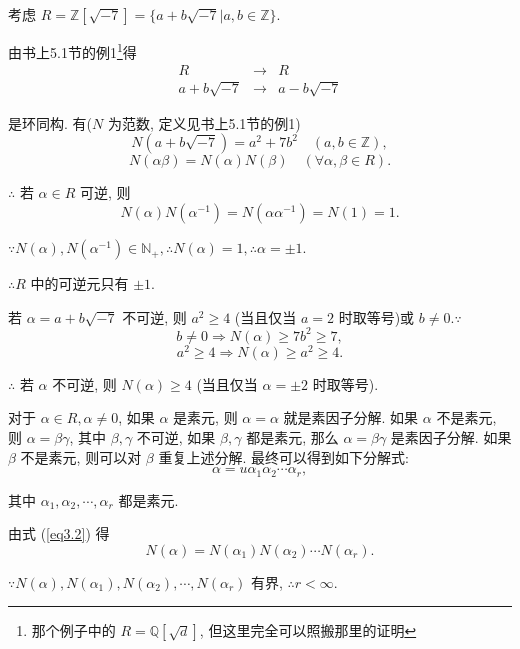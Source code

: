 \documentclass[UTF8]{ctexart}
\begin{document}
\begin{example}\label{exp3.2}
    考虑 $R=\mathbb{Z}[\sqrt{-7}]=\{a+b\sqrt{-7}|a,b\in\mathbb{Z}\}$.

    由书上5.1节的例1\footnote{那个例子中的 $R=\mathbb{Q}[\sqrt{d}]$, 但这里完全可以照搬那里的证明}得
    \begin{equation}\label{eq3.1}
        \begin{array}{rcl}
            R & \to & R \\
            a+b\sqrt{-7} & \to & a-b\sqrt{-7}
        \end{array}
    \end{equation}

    是环同构. 有($N$ 为范数, 定义见书上5.1节的例1)
    \[N(a+b\sqrt{-7})=a^2+7b^2\quad(a,b\in\mathbb{Z}),\]
    \begin{equation}\label{eq3.2}
        N(\alpha\beta)=N(\alpha)N(\beta)\quad(\forall\alpha,\beta\in R).
    \end{equation}

    $\therefore$ 若 $\alpha\in R$ 可逆, 则
    \[N(\alpha)N(\alpha^{-1})=N(\alpha\alpha^{-1})=N(1)=1.\]

    $\because N(\alpha),N(\alpha^{-1})\in\mathbb{N}_+,\therefore N(\alpha)=1,\therefore\alpha=\pm1$.

    $\therefore R$ 中的可逆元只有 $\pm1$.

    若 $\alpha=a+b\sqrt{-7}$ 不可逆, 则 $a^2\geq4$ (当且仅当 $a=2$ 时取等号)或 $b\neq0.\because$
    \[b\neq0\Rightarrow N(\alpha)\geq7b^2\geq7,\]
    \[a^2\geq4\Rightarrow N(\alpha)\geq a^2\geq4.\]

    $\therefore$ 若 $\alpha$ 不可逆, 则 $N(\alpha)\geq4$ (当且仅当 $\alpha=\pm2$ 时取等号).

    对于 $\alpha\in R,\alpha\neq0$, 如果 $\alpha$ 是素元, 则 $\alpha=\alpha$ 就是素因子分解. 如果 $\alpha$ 不是素元, 则 $\alpha=\beta\gamma$, 其中 $\beta,\gamma$ 不可逆, 如果 $\beta,\gamma$ 都是素元, 那么 $\alpha=\beta\gamma$ 是素因子分解. 如果 $\beta$ 不是素元, 则可以对 $\beta$ 重复上述分解. 最终可以得到如下分解式:
    \begin{equation}\label{eq3.3}
        \alpha=u\alpha_1\alpha_2\cdots\alpha_r,
    \end{equation}

    其中 $\alpha_1,\alpha_2,\cdots,\alpha_r$ 都是素元.

    由式 (\ref{eq3.2}) 得
    \[N(\alpha)=N(\alpha_1)N(\alpha_2)\cdots N(\alpha_r).\]

    $\because N(\alpha),N(\alpha_1),N(\alpha_2),\cdots,N(\alpha_r)$ 有界, $\therefore r<\infty$.


\end{example}
\end{document}

